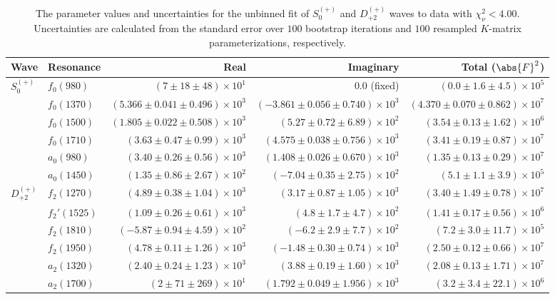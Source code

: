 \begin{table}[ht]
    \begin{center}
        \begin{tabular}{llrrr}\toprule
        Wave & Resonance & Real & Imaginary & Total ($\abs{F}^2$) \\\midrule
$S_{0}^{(+)}$ & $f_{0}(980)$ & $(7 \pm 18 \pm 48) \times 10^{1}$ & $0.0$ (fixed) & $(0.0 \pm 1.6 \pm 4.5) \times 10^{5}$ \\
 & $f_{0}(1370)$ & $(5.366 \pm 0.041 \pm 0.496) \times 10^{3}$ & $(-3.861 \pm 0.056 \pm 0.740) \times 10^{3}$ & $(4.370 \pm 0.070 \pm 0.862) \times 10^{7}$ \\
 & $f_{0}(1500)$ & $(1.805 \pm 0.022 \pm 0.508) \times 10^{3}$ & $(5.27 \pm 0.72 \pm 6.89) \times 10^{2}$ & $(3.54 \pm 0.13 \pm 1.62) \times 10^{6}$ \\
 & $f_{0}(1710)$ & $(3.63 \pm 0.47 \pm 0.99) \times 10^{3}$ & $(4.575 \pm 0.038 \pm 0.756) \times 10^{3}$ & $(3.41 \pm 0.19 \pm 0.87) \times 10^{7}$ \\
 & $a_{0}(980)$ & $(3.40 \pm 0.26 \pm 0.56) \times 10^{3}$ & $(1.408 \pm 0.026 \pm 0.670) \times 10^{3}$ & $(1.35 \pm 0.13 \pm 0.29) \times 10^{7}$ \\
 & $a_{0}(1450)$ & $(1.35 \pm 0.86 \pm 2.67) \times 10^{2}$ & $(-7.04 \pm 0.35 \pm 2.75) \times 10^{2}$ & $(5.1 \pm 1.1 \pm 3.9) \times 10^{5}$ \\
$D_{+2}^{(+)}$ & $f_{2}(1270)$ & $(4.89 \pm 0.38 \pm 1.04) \times 10^{3}$ & $(3.17 \pm 0.87 \pm 1.05) \times 10^{3}$ & $(3.40 \pm 1.49 \pm 0.78) \times 10^{7}$ \\
 & $f_{2}'(1525)$ & $(1.09 \pm 0.26 \pm 0.61) \times 10^{3}$ & $(4.8 \pm 1.7 \pm 4.7) \times 10^{2}$ & $(1.41 \pm 0.17 \pm 0.56) \times 10^{6}$ \\
 & $f_{2}(1810)$ & $(-5.87 \pm 0.94 \pm 4.59) \times 10^{2}$ & $(-6.2 \pm 2.9 \pm 7.7) \times 10^{2}$ & $(7.2 \pm 3.0 \pm 11.7) \times 10^{5}$ \\
 & $f_{2}(1950)$ & $(4.78 \pm 0.11 \pm 1.26) \times 10^{3}$ & $(-1.48 \pm 0.30 \pm 0.74) \times 10^{3}$ & $(2.50 \pm 0.12 \pm 0.66) \times 10^{7}$ \\
 & $a_{2}(1320)$ & $(2.40 \pm 0.24 \pm 1.23) \times 10^{3}$ & $(3.88 \pm 0.19 \pm 1.60) \times 10^{3}$ & $(2.08 \pm 0.13 \pm 1.71) \times 10^{7}$ \\
 & $a_{2}(1700)$ & $(2 \pm 71 \pm 269) \times 10^{1}$ & $(1.792 \pm 0.049 \pm 1.956) \times 10^{3}$ & $(3.2 \pm 3.4 \pm 22.1) \times 10^{6}$ \\\bottomrule
        \end{tabular}
    \caption{The parameter values and uncertainties for the unbinned fit of $S_{0}^{(+)}$ and $D_{+2}^{(+)}$ waves to data with $\chi^2_\nu < 4.00$. Uncertainties are calculated from the standard error over $100$ bootstrap iterations and $100$ resampled $K$-matrix parameterizations, respectively.}\label{tab:unbinned-fit-chisqdof-4.0-resampled-Sp0p-Dp2p}
    \end{center}
\end{table}
